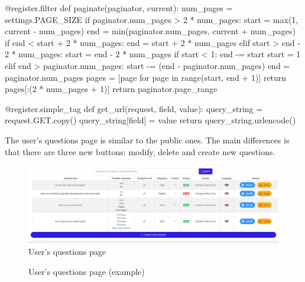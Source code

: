 \documentclass[12pt,english]{article}
\begin{document}
\begin{python}[caption={Pagination code snippets. Retrieved from \href{https://medium.com/@sumitlni/paginate-properly-please-93e7ca776432}{https://medium.com/@sumitlni/paginate-properly-please-93e7ca776432}}, captionpos=b]
@register.filter
def paginate(paginator, current):
  num_pages = settings.PAGE_SIZE
  if paginator.num_pages > 2 * num_pages:
      start = max(1, current - num_pages)
      end = min(paginator.num_pages, current + num_pages)
      if end < start + 2 * num_pages:
          end = start + 2 * num_pages
      elif start > end - 2 * num_pages:
          start = end - 2 * num_pages
      if start < 1:
          end -= start
          start = 1
      elif end > paginator.num_pages:
          start -= (end - paginator.num_pages)
          end = paginator.num_pages
      pages = [page for page in range(start, end + 1)]
      return pages[:(2 * num_pages + 1)]
  return paginator.page_range

@register.simple_tag
def get_url(request, field, value):
    query_string = request.GET.copy()
    query_string[field] = value
    return query_string.urlencode()
\end{python}



The user's questions page is similar to the public ones. The main differences is that there are three new buttons: modify, delete and create new questions.

\begin{figure}[H]
    \centering
    \includegraphics[width=\textwidth]{my_questions.png}
    \caption{User's questions page}
\end{figure}


\begin{figure}[H]
    \caption{User's questions page (example)}
\end{figure}
\end{document}
